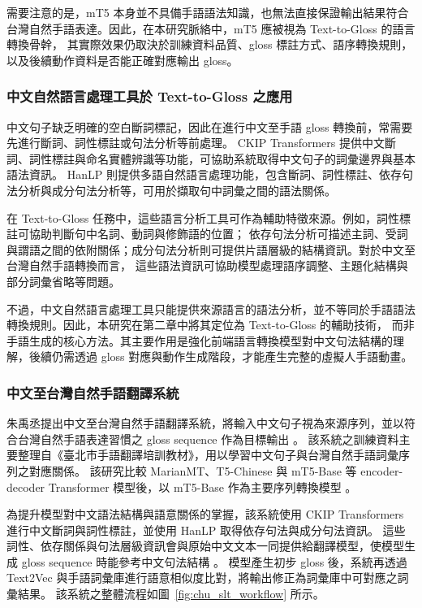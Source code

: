 \documentclass[class=NCU_thesis, crop=false]{standalone}
\begin{document}
需要注意的是，mT5 本身並不具備手語語法知識，也無法直接保證輸出結果符合台灣自然手語表達。因此，在本研究脈絡中，mT5 應被視為 Text-to-Gloss 的語言轉換骨幹，
其實際效果仍取決於訓練資料品質、gloss 標註方式、語序轉換規則，以及後續動作資料是否能正確對應輸出 gloss。

\subsubsection{中文自然語言處理工具於 Text-to-Gloss 之應用}
\label{subsubsec:chinese_nlp_tools}

中文句子缺乏明確的空白斷詞標記，因此在進行中文至手語 gloss 轉換前，常需要先進行斷詞、詞性標註或句法分析等前處理。
CKIP Transformers 提供中文斷詞、詞性標註與命名實體辨識等功能，可協助系統取得中文句子的詞彙邊界與基本語法資訊\cite{ckiptransformers}。
HanLP 則提供多語自然語言處理功能，包含斷詞、詞性標註、依存句法分析與成分句法分析等，可用於擷取句中詞彙之間的語法關係\cite{he-choi-2021-stem}。

在 Text-to-Gloss 任務中，這些語言分析工具可作為輔助特徵來源。例如，詞性標註可協助判斷句中名詞、動詞與修飾語的位置；
依存句法分析可描述主詞、受詞與謂語之間的依附關係；成分句法分析則可提供片語層級的結構資訊。對於中文至台灣自然手語轉換而言，
這些語法資訊可協助模型處理語序調整、主題化結構與部分詞彙省略等問題\cite{tsay2004morphology,smith2005taiwan,Chu2025SLT}。

不過，中文自然語言處理工具只能提供來源語言的語法分析，並不等同於手語語法轉換規則。因此，本研究在第二章中將其定位為 Text-to-Gloss 的輔助技術，
而非手語生成的核心方法。其主要作用是強化前端語言轉換模型對中文句法結構的理解，後續仍需透過 gloss 對應與動作生成階段，才能產生完整的虛擬人手語動畫。

\subsubsection{中文至台灣自然手語翻譯系統}
\label{subsubsec:chu_slt_system}

朱禹丞提出中文至台灣自然手語翻譯系統，將輸入中文句子視為來源序列，並以符合台灣自然手語表達習慣之 gloss sequence 作為目標輸出 \cite{Chu2025SLT}。
該系統之訓練資料主要整理自《臺北市手語翻譯培訓教材》\cite{signbook,Chu2025SLT}，用以學習中文句子與台灣自然手語詞彙序列之對應關係。
該研究比較 MarianMT、T5-Chinese 與 mT5-Base 等 encoder-decoder Transformer 模型後，以 mT5-Base 作為主要序列轉換模型 \cite{xue2021mt5massivelymultilingualpretrained,Chu2025SLT}。

為提升模型對中文語法結構與語意關係的掌握，該系統使用 CKIP Transformers 進行中文斷詞與詞性標註，並使用 HanLP 取得依存句法與成分句法資訊。
這些詞性、依存關係與句法層級資訊會與原始中文文本一同提供給翻譯模型，使模型生成 gloss sequence 時能參考中文句法結構 \cite{ckiptransformers,he-choi-2021-stem,Chu2025SLT}。
模型產生初步 gloss 後，系統再透過 Text2Vec 與手語詞彙庫進行語意相似度比對，將輸出修正為詞彙庫中可對應之詞彙結果。
該系統之整體流程如圖~\ref{fig:chu_slt_workflow} 所示。
\end{document}
